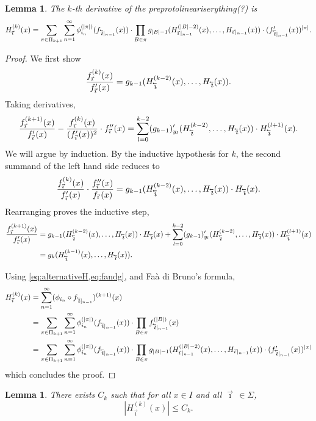 \documentclass[12pt,]{article}
\newtheorem{lemma}[theorem]{Lemma}
\theoremstyle{definition}
\theoremstyle{remark}
\newcommand{\0}{\mathbf{0}}
\newcommand{\cev}[1]{\reflectbox{\ensuremath{\vec{\reflectbox{\ensuremath{#1}}}}}}
\newcommand{\bi}{\vec{\imath}\,}
\newcommand{\bbi}{\,\cev{\imath}}
\begin{document}
\begin{lemma}
  \label{thm:ugly}
  The $k$-th derivative of the preprotolineariserything(?) is
  \[
  H_{\bi}^{(k)}(x)
  =\sum_{\pi\in\Pi_{k+1}} \sum_{n=1}^\infty \phi_{i_n}^{(|\pi|)}(f_{\bbi|_{n-1}}(x))\cdot
  \prod_{B\in\pi}
  g_{|B|-1}(H_{\bi|_{n-1}}^{(|B|-2)}(x),\dots,H_{\bi|_{n-1}}(x))\cdot(f'_{\bbi|_{n-1}}(x))^{|\pi|}.
  \]
\end{lemma}
\begin{proof}
  We first show
  \begin{equation}
    \label{eq:fandg}
    \frac{f_{\bi}^{(k)}(x)}{f_{\bi}'(x)}
    =
    g_{k-1}(H_{\bbi}^{(k-2)}(x), \dots, H_{\bbi}(x)).
  \end{equation}
  Taking derivatives,
  \[
    \frac{f_{\bi}^{(k+1)}(x)}{f_{\bi}'(x)} - \frac{f_{\bi}^{(k)}(x)}{(f_{\bi}'(x))^2}\cdot f_{\bi}''(x)
    =\sum_{l=0}^{k-2}(g_{k-1})'_{y_l}(H_{\bbi}^{(k-2)},\dots,H_{\bbi}(x)) \cdot H_{\bbi}^{(l+1)}(x).
  \]
  We will argue by induction. By the inductive hypothesis for $k$, the second summand of the left hand
  side reduces to
  \[
    \frac{f_{\bi}^{(k)}(x)}{f_{\bi}'(x)}\cdot \frac{f_{\bi}''(x)}{f_{\bi}(x)}
    =g_{k-1}(H_{\bbi}^{(k-2)}(x),\dots, H_{\bbi}(x)) \cdot H_{\bbi}(x).
  \]
  Rearranging proves the inductive step,
  \begin{align*}
    \frac{f_{\bi}^{(k+1)}(x)}{f_{\bi}'(x)}
  &=
  g_{k-1}(H_{\bbi}^{(k-2)}(x),\dots, H_{\bbi}(x)) \cdot H_{\bbi}(x)
  +
  \sum_{l=0}^{k-2}(g_{k-1})'_{y_l}(H_{\bbi}^{(k-2)},\dots,H_{\bbi}(x)) \cdot H_{\bbi}^{(l+1)}(x)
  \\
  &=
  g_{k}(H_{\bbi}^{(k-1)}(x), \dots, H_{\bbi}(x)).
  \end{align*}

Using \cref{eq:alternativeH,eq:fandg}, and Fa\`a di Bruno's formula,
\begin{align}
  H_{\bi}^{(k)}(x)
  &=\sum_{n=1}^\infty (\phi_{i_n}\circ f_{\bbi|_{n-1}})^{(k+1)}(x) \nonumber\\
  &=\sum_{\pi\in\Pi_{k+1}} \sum_{n=1}^\infty \phi_{i_n}^{(|\pi|)}(f_{\bbi|_{n-1}}(x))\cdot
  \prod_{B\in\pi} f_{\bbi|_{n-1}}^{(|B|)}(x)\nonumber\\
  &=\sum_{\pi\in\Pi_{k+1}} \sum_{n=1}^\infty \phi_{i_n}^{(|\pi|)}(f_{\bbi|_{n-1}}(x))\cdot
  \prod_{B\in\pi}
  g_{|B|-1}(H_{\bi|_{n-1}}^{(|B|-2)}(x),\dots,H_{\bi|_{n-1}}(x))\cdot(f'_{\bbi|_{n-1}}(x))^{|\pi|}\nonumber
\end{align}
which concludes the proof.
\end{proof}
\begin{lemma}\label{thm:kbound}
  There exists $C_k$ such that for all $x\in I$ and all $\bi\in\Sigma$,
  \[
    |H_{\bi}^{(k)}(x)|\leq C_k.
  \]
\end{lemma}
\end{document}
